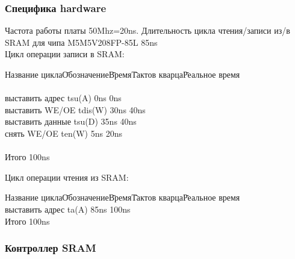 \subsubsection{Специфика hardware}
Частота работы платы 50Mhz=20ns. Длительность цикла чтения/записи из/в SRAM для чипа M5M5V208FP-85L 85ns\\

Цикл операции записи в SRAM:
\begin{tabbing}
Название цикла\qquad\=Обозначение\qquad\=Время\qquad\=Тактов кварца\qquad\=Реальное время\\
\\
выставить адрес \> tsu(A) \> 0ns  \> 0ns \\
выставить WE/OE \> tdis(W) \> 30ns  \> 40ns \\
выставить данные \> tsu(D) \> 35ns  \> 40ns \\
снять WE/OE \> ten(W) \> 5ns  \> 20ns \\
\\
Итого \> \>   \> 100ns\\
\end{tabbing}

Цикл операции чтения из SRAM:
\begin{tabbing}
Название цикла\qquad\=Обозначение\qquad\=Время\qquad\=Тактов кварца\qquad\=Реальное время\\
выставить адрес \> ta(A) \> 85ns  \> 100ns \\
Итого \> \>  \> 100ns \\
\end{tabbing}

\subsubsection{Контроллер SRAM}
